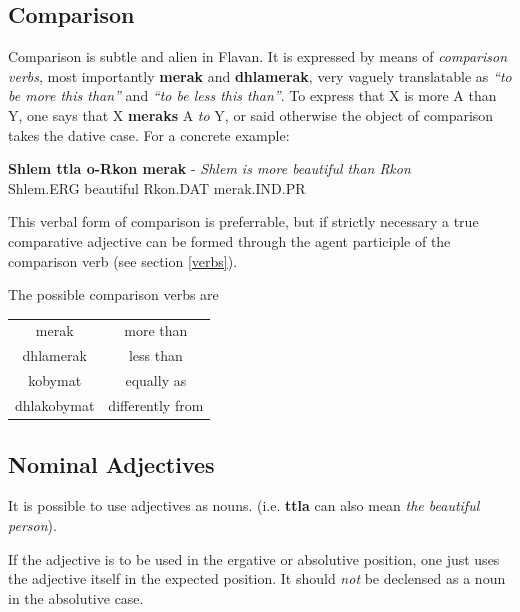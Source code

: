 \documentclass[10pt,oneside]{memoir}
\newcommand{\flav}[1]{  
    \rotatebox[origin=c]{270}{
		\begin{varwidth}{10 cm}
			{\centering \flavan  #1}
		\end{varwidth}
    }
    }
\newcommand{\Flav}[1]{{\Large \flav{#1}}}
\begin{document}
\subsection{Comparison}

Comparison is subtle and alien in Flavan. It is expressed by means of \emph{comparison verbs}, most importantly \textbf{merak} and \textbf{dhlamerak}, very vaguely translatable as \emph{``to be more this than''} and \emph{``to be less this than''}. To express that X is more A than Y, one says that X \textbf{meraks} A \emph{to} Y, or said otherwise the object of comparison takes the dative case. For a concrete example:

\begin{center}
	\textbf{Shlem ttla o-Rkon merak} - \emph{Shlem is more beautiful than Rkon}\\
	Shlem.ERG beautiful Rkon.DAT merak.IND.PR\\
	\Flav{shlem ttlaa\\orkon merak}
\end{center}

This verbal form of comparison is preferrable, but if strictly necessary a true comparative adjective can be formed through the agent participle of the comparison verb (see section \ref{verbs}).

The possible comparison verbs are

\begin{center}
\begin{tabular}{c | c}
	merak & more than\\
	dhlamerak & less than\\
	kobymat & equally as\\
	dhlakobymat & differently from
\end{tabular}
\end{center}







\subsection{Nominal Adjectives}

It is possible to use adjectives as nouns. (i.e. \textbf{ttla} can also mean \emph{the beautiful person}). 

If the adjective is to be used in the ergative or absolutive position, one just uses the adjective itself in the expected position. It should \emph{not} be declensed as a noun in the absolutive case.
\end{document}
